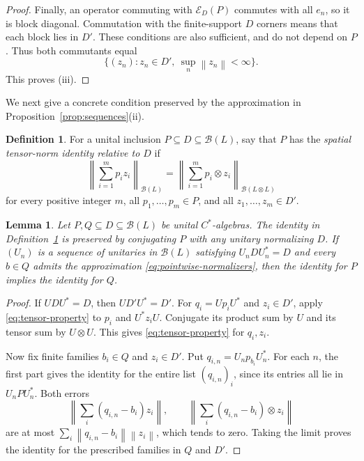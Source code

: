 \documentclass[11pt]{article}
\newtheorem{lemma}[theorem]{Lemma}
\theoremstyle{definition}
\newtheorem{definition}[theorem]{Definition}
\theoremstyle{remark}
\newcommand{\B}{\mathcal B}
\newcommand{\E}{\mathcal E}
\newcommand{\norm}[1]{\left\|#1\right\|}
\begin{document}
\begin{proof}
Finally, an operator commuting with $\E_D(P)$ commutes with all $e_n$,
so it is block diagonal. Commutation with the finite-support $D$ corners
means that each block lies in $D'$. These conditions are also sufficient,
and do not depend on $P$. Thus both commutants equal
\[
\{(z_n):z_n\in D',\ \sup_n\norm{z_n}<\infty\}.
\]
This proves (iii).
\end{proof}

We next give a concrete condition preserved by the
approximation in Proposition~\ref{prop:sequences}(ii).

\begin{definition}\label{def:tensor}
For a unital inclusion $P\subseteq D\subseteq\B(L)$, say that $P$ has
the \emph{spatial tensor-norm identity relative to $D$} if
\begin{equation}\label{eq:tensor-property}
\norm{\sum_{i=1}^m p_i z_i}_{\B(L)}
=\norm{\sum_{i=1}^m p_i\otimes z_i}_{\B(L\otimes L)}
\end{equation}
for every positive integer $m$, all $p_1,\ldots,p_m\in P$, and all
$z_1,\ldots,z_m\in D'$.
\end{definition}

\begin{lemma}\label{lem:invariant}
Let $P,Q\subseteq D\subseteq\B(L)$ be unital $C^*$-algebras.
The identity in Definition~\ref{def:tensor} is preserved by conjugating
$P$ with any unitary normalizing $D$. If $(U_n)$ is a sequence of unitaries
in $\B(L)$ satisfying $U_nDU_n^*=D$ and every $b\in Q$ admits the
approximation \eqref{eq:pointwise-normalizers}, then the identity for $P$
implies the identity for $Q$.
\end{lemma}

\begin{proof}
If $UDU^*=D$, then $UD'U^*=D'$. For $q_i=Up_iU^*$ and $z_i\in D'$,
apply \eqref{eq:tensor-property} to $p_i$ and $U^*z_iU$. Conjugate its
product sum by $U$ and its tensor sum by $U\otimes U$. This gives
\eqref{eq:tensor-property} for $q_i,z_i$.

Now fix finite families $b_i\in Q$ and $z_i\in D'$. Put
$q_{i,n}=U_np_{b_i}U_n^*$. For each $n$, the first part gives the identity
for the entire list $(q_{i,n})_i$, since its entries all lie in
$U_nPU_n^*$. Both errors
\[
\norm{\sum_i(q_{i,n}-b_i)z_i},\qquad
\norm{\sum_i(q_{i,n}-b_i)\otimes z_i}
\]
are at most $\sum_i\norm{q_{i,n}-b_i}\norm{z_i}$, which tends to zero.
Taking the limit proves the identity for the prescribed families in
$Q$ and $D'$.
\end{proof}
\end{document}
